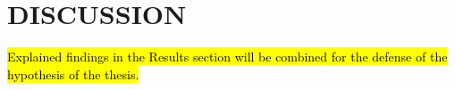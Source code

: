 \chapter{DISCUSSION}
\hl{Explained findings in the Results section will be combined for the defense of the hypothesis of the thesis.}
